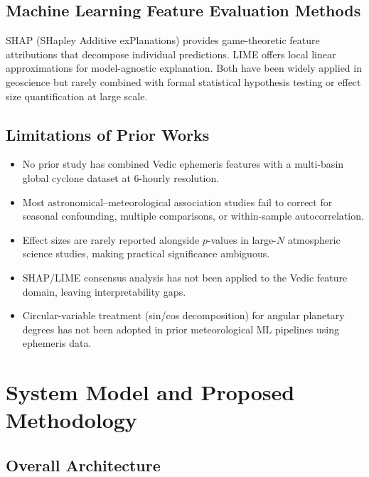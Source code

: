 \documentclass[12pt,a4paper]{article}
\begin{document}
    \subsection{Machine Learning Feature Evaluation Methods}

    SHAP (SHapley Additive exPlanations) \cite{lundberg2017unified} provides
    game-theoretic feature attributions that decompose individual predictions. LIME
    \cite{ribeiro2016} offers local linear approximations for model-agnostic
    explanation. Both have been widely applied in geoscience but rarely combined
    with formal statistical hypothesis testing or effect size quantification at
    large scale.

    \subsection{Limitations of Prior Works}

    \begin{itemize}[noitemsep]
    \item No prior study has combined Vedic ephemeris features with a multi-basin
            global cyclone dataset at 6-hourly resolution.
    \item Most astronomical--meteorological association studies fail to correct
            for seasonal confounding, multiple comparisons, or within-sample
            autocorrelation.
    \item Effect sizes are rarely reported alongside $p$-values in large-$N$
            atmospheric science studies, making practical significance ambiguous.
    \item SHAP/LIME consensus analysis has not been applied to the Vedic feature
            domain, leaving interpretability gaps.
    \item Circular-variable treatment (sin/cos decomposition) for angular
            planetary degrees has not been adopted in prior meteorological ML
            pipelines using ephemeris data.
    \end{itemize}

    \section{System Model and Proposed Methodology}
    \label{sec:methodology}

    \subsection{Overall Architecture}
\end{document}
